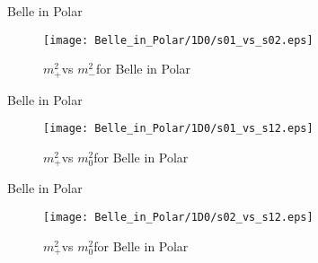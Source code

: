 \documentclass{beamer}
\newcommand{\MP}{\ensuremath{m^2_+}}
\newcommand{\MM}{\ensuremath{m^2_-}}
\newcommand{\MZ}{\ensuremath{m^2_0}}
\begin{document}
\begin{frame}{Belle in Polar}
\begin{figure}
\texttt{[image: Belle\_in\_Polar/1D0/s01\_vs\_s02.eps]}
\caption{\MP vs \MM for Belle in Polar}
\end{figure}
\end{frame}
\begin{frame}{Belle in Polar}
\begin{figure}
\texttt{[image: Belle\_in\_Polar/1D0/s01\_vs\_s12.eps]}
\caption{\MP vs \MZ for Belle in Polar}
\end{figure}
\end{frame}
\begin{frame}{Belle in Polar}
\begin{figure}
\texttt{[image: Belle\_in\_Polar/1D0/s02\_vs\_s12.eps]}
\caption{\MP vs \MZ for Belle in Polar}
\end{figure}
\end{frame}
\end{document}
